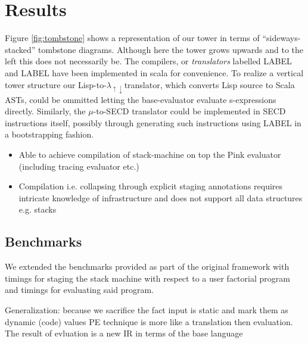 \documentclass[fleqn]{article}
\theoremstyle{definition}
\newcommand{\mslang}{$\lambda_{\uparrow\downarrow}$}
\begin{document}
\section{Results}
Figure \ref{fig:tombstone} shows a representation of our tower in terms of ``sideways-stacked'' tombstone diagrams. Although here the tower grows upwards and to the left this does not necessarily be. The compilers, or \textit{translators} labelled LABEL and LABEL have been implemented in scala for convenience. To realize a vertical tower structure our Lisp-to-\mslang translator, which converts Lisp source to Scala ASTs, could be ommitted letting the base-evaluator evaluate s-expressions directly. Similarly, the $\mu$-to-SECD translator could be implemented in SECD instructions itself, possibly through generating such instructions using LABEL in a bootstrapping fashion.

\begin{itemize}
	\item Able to achieve compilation of stack-machine on top the Pink evaluator (including tracing evaluator etc.)
	\item Compilation i.e. collapsing through explicit staging annotations requires intricate knowledge of infrastructure and does not support all data structures e.g. stacks
\end{itemize}

\subsection{Benchmarks}
We extended the benchmarks provided as part of the original framework \cite{amin2017collapsing} with timings for staging the stack machine with respect to a user factorial program and timings for evaluating said program.

Generalization: because we sacrifice the fact input is static and mark them as dynamic (code) values
PE technique is more like a translation then evaluation. The result of evluation is a new IR in terms of the base language
\end{document}
